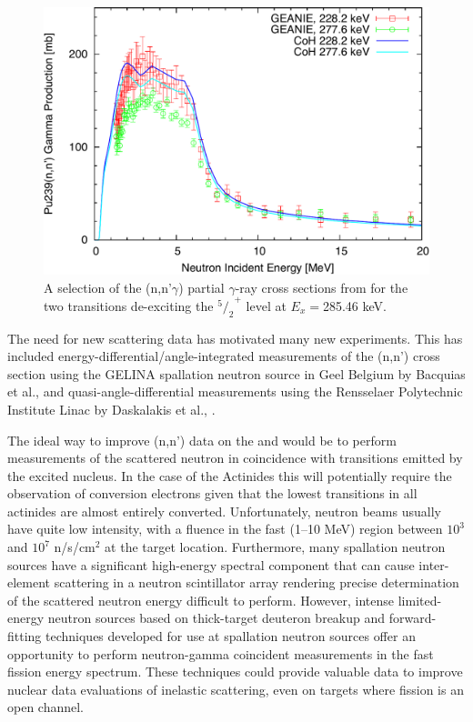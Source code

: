 \documentclass[letterpaper]{ar-1col}
\begin{document}
\begin{figure}[t]
 \centering
 \includegraphics[width=0.6\linewidth]{239pu_nn_cropped.pdf}

 \caption{A selection of the (n,n'$\gamma$) partial $\gamma$-ray cross sections from \cite{Ber00} for the two transitions de-exciting the ${^5/_2}^{+}$ level at $E_x=$285.46 keV.}
 \label{fig:239pu_nn_cropped}
\end{figure}


The need for new scattering data has motivated many new experiments.
 This has included energy-differential/angle-integrated measurements of the (n,n') cross section using the GELINA spallation neutron source in Geel Belgium by Bacquias et al., \cite{Nem13} and quasi-angle-differential measurements using the Rensselaer Polytechnic Institute Linac by Daskalakis et al., \cite{Das14}.


The ideal way to improve (n,n') data on the  and  would be to perform measurements of the scattered neutron in coincidence with transitions emitted by the excited nucleus.
 In the case of the Actinides this will potentially require the observation of conversion electrons given that the lowest transitions in all actinides are almost entirely converted.
 Unfortunately, neutron beams usually have quite low intensity, with a fluence in the fast (1--10 MeV) region between $10^3$ and $10^7$ n/s/cm$^2$ at the target location.
 Furthermore, many spallation neutron sources have a significant high-energy spectral component that can cause inter-element scattering in a neutron scintillator array rendering precise determination of the scattered neutron energy difficult to  perform.
However, intense limited-energy neutron sources based on thick-target deuteron breakup \cite{Harrig2018} and forward-fitting techniques developed for use at spallation neutron sources \cite{Kee18} offer an opportunity to perform neutron-gamma coincident measurements in the fast fission energy spectrum.
 These techniques could provide valuable data to improve nuclear data evaluations of inelastic scattering, even on targets where fission is an open channel.
\end{document}
